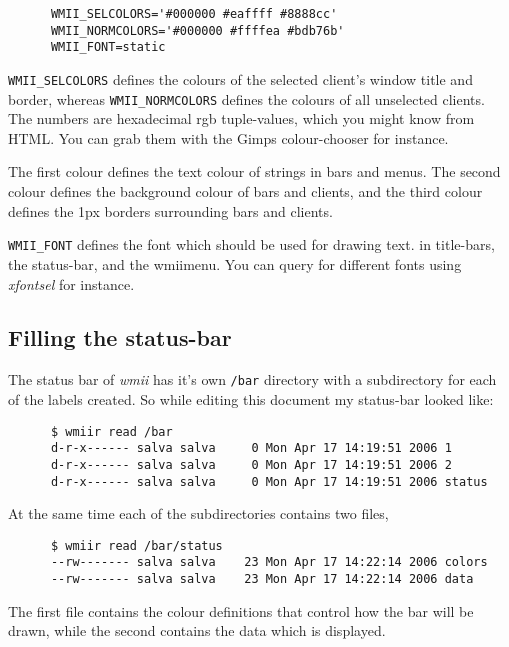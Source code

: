\documentclass[12pt,a4paper]{article} %
\newcommand{\wmii}{\emph{wmii}}
\begin{document}
    \begin{verbatim}
      WMII_SELCOLORS='#000000 #eaffff #8888cc'
      WMII_NORMCOLORS='#000000 #ffffea #bdb76b'
      WMII_FONT=static
    \end{verbatim}

    \verb+WMII_SELCOLORS+ defines the colours of the selected client's window
    title and border, whereas \verb+WMII_NORMCOLORS+ defines the colours of all
    unselected clients. The numbers are hexadecimal rgb tuple-values, which you
    might know from HTML. You can grab them with the Gimps colour-chooser for instance.

    The first colour defines the text colour of strings in bars and menus.
    The second colour defines the background colour of bars and clients, and
    the third colour defines the 1px borders surrounding bars and clients.

    \verb+WMII_FONT+ defines the font which should be used for drawing text.
    in title-bars, the status-bar, and the wmiimenu.
    You can query for different fonts using \emph{xfontsel} for instance.

    \subsection{Filling the status-bar}
    \label{subsec:status}
    
    The status bar of \wmii{} has it's own \verb+/bar+ directory with
    a subdirectory for each of the labels created. So while editing
    this document my status-bar looked like:

    \begin{verbatim}
      $ wmiir read /bar
      d-r-x------ salva salva     0 Mon Apr 17 14:19:51 2006 1
      d-r-x------ salva salva     0 Mon Apr 17 14:19:51 2006 2
      d-r-x------ salva salva     0 Mon Apr 17 14:19:51 2006 status
    \end{verbatim}
    
    At the same time each of the subdirectories contains two files,

    \begin{verbatim}
      $ wmiir read /bar/status
      --rw------- salva salva    23 Mon Apr 17 14:22:14 2006 colors
      --rw------- salva salva    23 Mon Apr 17 14:22:14 2006 data
    \end{verbatim}


    The first file contains the colour definitions that control how the
    bar will be drawn, while the second contains the data
    which is displayed.
    
\end{document}
